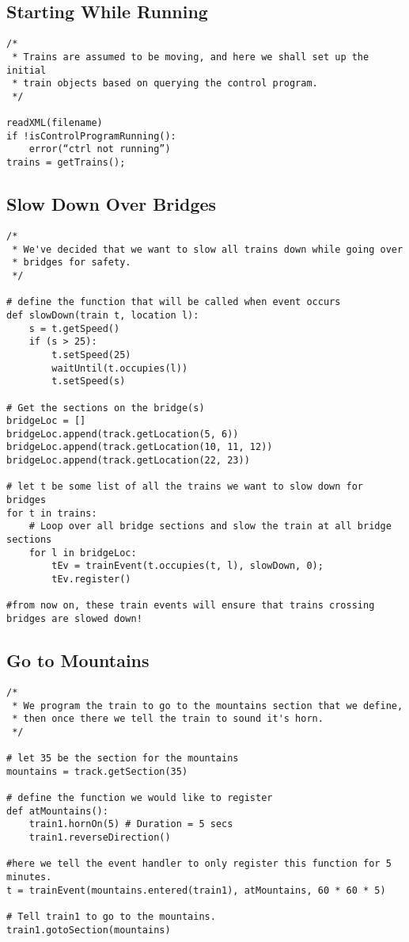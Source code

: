 \documentclass[a4paper,11pt,notitlepage]{article}
\begin{document}
\subsection{Starting While Running}
\begin{verbatim}
/*
 * Trains are assumed to be moving, and here we shall set up the initial
 * train objects based on querying the control program.
 */

readXML(filename)
if !isControlProgramRunning():
    error(“ctrl not running”)
trains = getTrains();
\end{verbatim}

\subsection{Slow Down Over Bridges}
\begin{verbatim}
/*
 * We've decided that we want to slow all trains down while going over
 * bridges for safety.
 */

# define the function that will be called when event occurs
def slowDown(train t, location l):
    s = t.getSpeed()
	if (s > 25):
		t.setSpeed(25)
		waitUntil(t.occupies(l))
		t.setSpeed(s)

# Get the sections on the bridge(s)
bridgeLoc = []
bridgeLoc.append(track.getLocation(5, 6))
bridgeLoc.append(track.getLocation(10, 11, 12))
bridgeLoc.append(track.getLocation(22, 23))

# let t be some list of all the trains we want to slow down for bridges
for t in trains:
	# Loop over all bridge sections and slow the train at all bridge sections
	for l in bridgeLoc:
		tEv = trainEvent(t.occupies(t, l), slowDown, 0);
		tEv.register()

#from now on, these train events will ensure that trains crossing bridges are slowed down!

\end{verbatim}
\subsection{Go to Mountains}
\begin{verbatim}
/*
 * We program the train to go to the mountains section that we define,
 * then once there we tell the train to sound it's horn.
 */

# let 35 be the section for the mountains
mountains = track.getSection(35)

# define the function we would like to register
def atMountains():
	train1.hornOn(5) # Duration = 5 secs
    train1.reverseDirection()

#here we tell the event handler to only register this function for 5 minutes.
t = trainEvent(mountains.entered(train1), atMountains, 60 * 60 * 5)

# Tell train1 to go to the mountains.
train1.gotoSection(mountains)



\end{verbatim}
\end{document}
